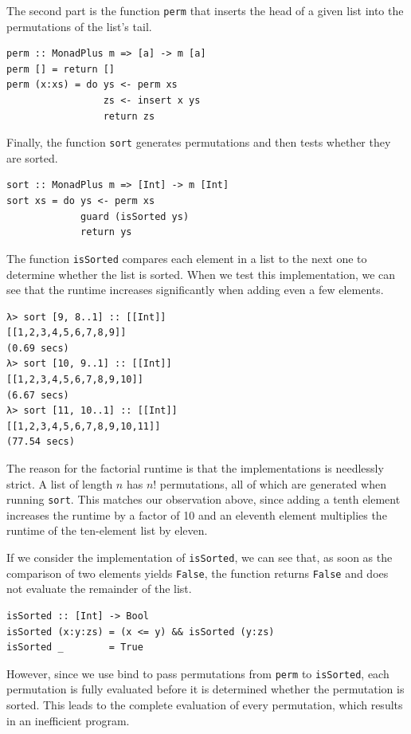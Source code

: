 \documentclass[a4paper, 11pt, fleqn, twoside]{scrreprt}
\newcommand{\hinl}[1]{\texttt{#1}}
\begin{document}
The second part is the function \hinl{perm} that inserts the 
head of a given list into the permutations of the list's tail.
\begin{verbatim}
perm :: MonadPlus m => [a] -> m [a]
perm [] = return []
perm (x:xs) = do ys <- perm xs
                 zs <- insert x ys
                 return zs
\end{verbatim}

Finally, the function \hinl{sort} generates permutations and 
then tests whether they are sorted.

\begin{verbatim}
sort :: MonadPlus m => [Int] -> m [Int]
sort xs = do ys <- perm xs
             guard (isSorted ys)
             return ys
\end{verbatim}

The function \hinl{isSorted} compares each element in a list to 
the next one to determine whether the list is sorted. When we test this 
implementation, we can see that the runtime increases significantly when adding 
even a few elements.

\begin{verbatim}
λ> sort [9, 8..1] :: [[Int]]
[[1,2,3,4,5,6,7,8,9]]
(0.69 secs)
λ> sort [10, 9..1] :: [[Int]]
[[1,2,3,4,5,6,7,8,9,10]]
(6.67 secs)
λ> sort [11, 10..1] :: [[Int]]
[[1,2,3,4,5,6,7,8,9,10,11]]
(77.54 secs)
\end{verbatim}

The reason for the factorial runtime is that the implementations is needlessly 
strict. A list of length $n$  has $n!$ permutations, all of which are generated 
when running \hinl{sort}. This matches our observation above, 
since adding a tenth element increases the runtime by a factor of 10 and an 
eleventh element multiplies the runtime of the ten-element list by eleven. 

If we consider the implementation of \hinl{isSorted}, we can see 
that, as soon as the comparison of two elements yields 
\hinl{False}, the function returns \hinl{False} 
and does not evaluate the remainder of the list.

\begin{verbatim}
isSorted :: [Int] -> Bool
isSorted (x:y:zs) = (x <= y) && isSorted (y:zs)
isSorted _        = True
\end{verbatim}

However, since we use bind to pass permutations from \hinl{perm} 
to \hinl{isSorted}, each permutation is fully evaluated before 
it is determined whether the permutation is sorted. This leads to the complete 
evaluation of every permutation, which results in an inefficient program.
\end{document}
